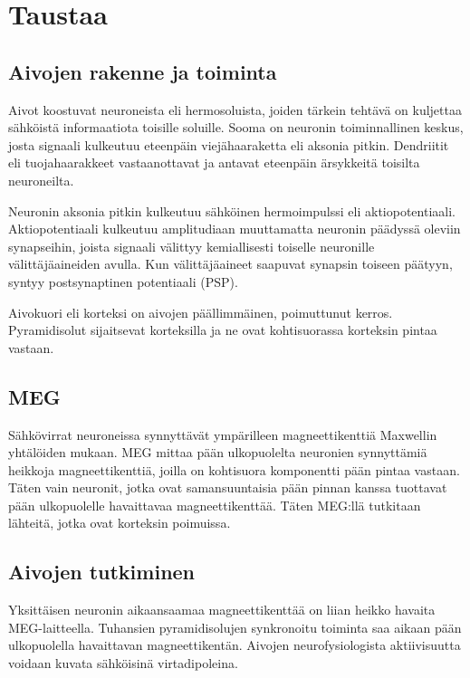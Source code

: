 \section{Taustaa}

\subsection{Aivojen rakenne ja toiminta}
Aivot koostuvat neuroneista eli hermosoluista, joiden tärkein tehtävä on kuljettaa sähköistä informaatiota toisille soluille. Sooma on neuronin toiminnallinen keskus, josta signaali kulkeutuu eteenpäin viejähaaraketta eli aksonia pitkin. Dendriitit eli tuojahaarakkeet vastaanottavat ja antavat eteenpäin ärsykkeitä toisilta neuroneilta. \citep{Hamalainen1993MagnetoencephalographytheoryBrain}

Neuronin aksonia pitkin kulkeutuu sähköinen hermoimpulssi eli aktiopotentiaali. Aktiopotentiaali kulkeutuu amplitudiaan muuttamatta neuronin päädyssä oleviin synapseihin, joista signaali välittyy kemiallisesti toiselle neuronille välittäjäaineiden avulla. Kun välittäjäaineet saapuvat synapsin toiseen päätyyn, syntyy postsynaptinen potentiaali (PSP). \citep{Hamalainen1993MagnetoencephalographytheoryBrain}

Aivokuori eli korteksi on aivojen päällimmäinen, poimuttunut kerros. Pyramidisolut sijaitsevat korteksilla ja ne ovat kohtisuorassa korteksin pintaa vastaan. \citep{Hamalainen1993MagnetoencephalographytheoryBrain}

\subsection{MEG}
Sähkövirrat neuroneissa synnyttävät ympärilleen magneettikenttiä Maxwellin yhtälöiden mukaan. MEG mittaa pään ulkopuolelta neuronien synnyttämiä heikkoja magneettikenttiä, joilla on kohtisuora komponentti pään pintaa vastaan. Täten vain neuronit, jotka ovat samansuuntaisia pään pinnan kanssa tuottavat pään ulkopuolelle havaittavaa magneettikenttää. Täten MEG:llä tutkitaan lähteitä, jotka ovat korteksin poimuissa. \citep[s. 5]{hansen2010meg}

\subsection{Aivojen tutkiminen}

Yksittäisen neuronin aikaansaamaa magneettikenttää on liian heikko havaita MEG-laitteella. Tuhansien pyramidisolujen synkronoitu toiminta saa aikaan pään ulkopuolella havaittavan magneettikentän. Aivojen neurofysiologista aktiivisuutta voidaan kuvata sähköisinä virtadipoleina. 

